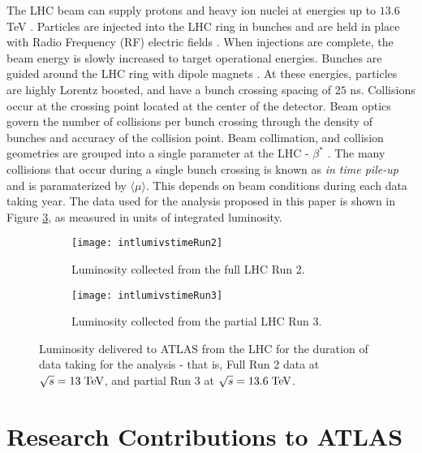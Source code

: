 \documentclass[12pt]{article}
\begin{document}
The LHC beam can supply protons and heavy ion nuclei at energies up to $13.6$
TeV \cite{Aad_2024}. Particles are injected into the LHC ring in bunches and are
held in place with Radio Frequency (RF) electric fields
\cite{bunch_filling_schemes_bailey}. When injections are complete, the beam
energy is slowly increased to target operational energies. Bunches are guided
around the LHC ring with dipole magnets \cite{The_ATLAS_Collaboration_2008,
bunch_filling_schemes_bailey}. At these energies, particles are highly Lorentz
boosted, and have a bunch crossing spacing of $25$ ns. Collisions occur at the
crossing point located at the center of the detector. Beam optics govern the
number of collisions per bunch crossing through the density of bunches and
accuracy of the collision point. Beam collimation, and collision geometries are
grouped into a single parameter at the LHC - $\beta^*$ \cite{Aad_2024}. The many
collisions that occur during a single bunch crossing is known as \textit{in time
pile-up} and is paramaterized by $\langle\mu\rangle$. This depends on beam
conditions during each data taking year. The data used for the analysis proposed
in this paper is shown in Figure \ref{fig:lhc_luminosity}, as measured in units
of integrated luminosity.

\begin{figure}[t!]
    \centering
    \begin{subfigure}[t]{.48\textwidth}
        \centering
        \texttt{[image: intlumivstimeRun2]}
        \caption{Luminosity collected from the full LHC Run 2.}
        \label{subfig:lumi_run2}
    \end{subfigure}
    \hfill
    \begin{subfigure}[t]{.48\textwidth}
        \centering
        \texttt{[image: intlumivstimeRun3]}
        \caption{Luminosity collected from the partial LHC Run 3.}
        \label{subfig:lumi_run3}
    \end{subfigure}
\caption{Luminosity delivered to ATLAS from the LHC for the duration of data
taking for the analysis - that is, Full Run 2 data at $\sqrt{s}=13\;\text{TeV}$, and
partial Run 3 at $\sqrt{s}=13.6\;\text{TeV}$.} %
\label{fig:lhc_luminosity}
\end{figure}

\section{Research Contributions to ATLAS}
\end{document}
